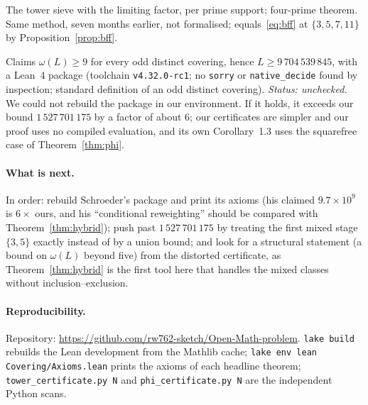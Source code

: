 \documentclass[11pt]{article}
\theoremstyle{definition}
\theoremstyle{remark}
\newcommand{\lean}[1]{\texttt{#1}}
\begin{document}
\begin{description}[leftmargin=1.5em]
\item[Hackmon (Zenodo, Apr.~2026).] The tower sieve with the limiting factor, per prime support; four-prime theorem. Same method, seven months earlier, not formalised; equals~\eqref{eq:bff} at $\{3,5,7,11\}$ by Proposition~\ref{prop:bff}.
\item[Schroeder (Zenodo, Sept.~2026).] Claims $\omega(L) \ge 9$ for every odd distinct covering, hence $L \ge 9\,704\,539\,845$, with a Lean~4 package (toolchain \lean{v4.32.0-rc1}; no \lean{sorry} or \lean{native\_decide} found by inspection; standard definition of an odd distinct covering). \emph{Status: unchecked.} We could not rebuild the package in our environment. If it holds, it exceeds our bound $1\,527\,701\,175$ by a factor of about $6$; our certificates are simpler and our proof uses no compiled evaluation, and its own Corollary~1.3 uses the squarefree case of Theorem~\ref{thm:phi}.
\end{description}

\paragraph{What is next.} In order: rebuild Schroeder's package and print its axioms (his claimed $9.7\times10^9$ is $6\times$ ours, and his ``conditional reweighting'' should be compared with Theorem~\ref{thm:hybrid}); push past $1\,527\,701\,175$ by treating the first mixed stage $\{3,5\}$ exactly instead of by a union bound; and look for a structural statement (a bound on $\omega(L)$ beyond five) from the distorted certificate, as Theorem~\ref{thm:hybrid} is the first tool here that handles the mixed classes without inclusion--exclusion.

\paragraph{Reproducibility.} Repository: \url{https://github.com/rw762-sketch/Open-Math-problem}. \lean{lake build} rebuilds the Lean development from the Mathlib cache; \lean{lake env lean Covering/Axioms.lean} prints the axioms of each headline theorem; \lean{tower\_certificate.py N} and \lean{phi\_certificate.py N} are the independent Python scans.
\end{document}
